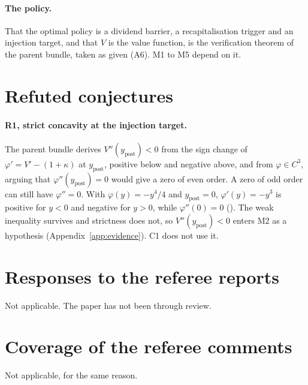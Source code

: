 \paragraph{The policy.} That the optimal policy is a dividend barrier, a
recapitalisation trigger and an injection target, and that $V$ is the value
function, is the verification theorem of the parent bundle, taken as given
(A6). M1 to M5 depend on it.

\section{Refuted conjectures}
\label{app:refuted}

\paragraph{R1, strict concavity at the injection target.} The parent bundle
derives $V''(y_{\text{post}})<0$ from the sign change of
$\varphi'=V'-(1+\kappa)$ at $y_{\text{post}}$, positive below and negative above,
and from $\varphi\in C^3$, arguing that $\varphi''(y_{\text{post}})=0$ would give
a zero of even order. A zero of odd order can still have $\varphi''=0$. With
$\varphi(y)=-y^4/4$ and $y_{\text{post}}=0$, $\varphi'(y)=-y^3$ is positive for
$y<0$ and negative for $y>0$, while $\varphi''(0)=0$
(). The weak inequality survives and
strictness does not, so $V''(y_{\text{post}})<0$ enters M2 as a hypothesis
(Appendix~\ref{app:evidence}). C1 does not use it.

\section{Responses to the referee reports}

Not applicable. The paper has not been through review.

\section{Coverage of the referee comments}

Not applicable, for the same reason.


